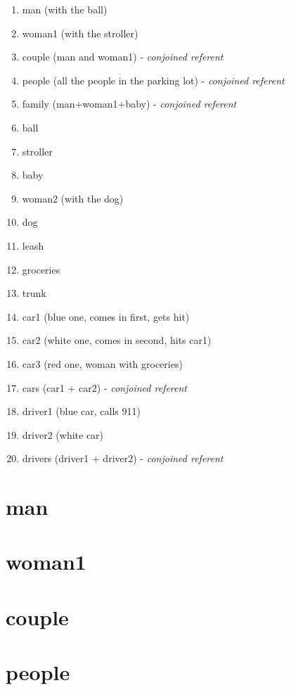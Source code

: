 \documentclass[
]{book}
\providecommand{\tightlist}{%
  \setlength{\itemsep}{0pt}\setlength{\parskip}{0pt}}
\begin{document}
\begin{enumerate}
\def\labelenumi{\arabic{enumi}.}
\tightlist
\item
  man (with the ball)
\item
  woman1 (with the stroller)
\item
  couple (man and woman1) - \emph{conjoined referent}
\item
  people (all the people in the parking lot) - \emph{conjoined referent}
\item
  family (man+woman1+baby) - \emph{conjoined referent}
\item
  ball
\item
  stroller
\item
  baby
\item
  woman2 (with the dog)
\item
  dog
\item
  leash
\item
  groceries
\item
  trunk
\item
  car1 (blue one, comes in first, gets hit)
\item
  car2 (white one, comes in second, hits car1)
\item
  car3 (red one, woman with groceries)
\item
  cars (car1 + car2) - \emph{conjoined referent}
\item
  driver1 (blue car, calls 911)
\item
  driver2 (white car)
\item
  drivers (driver1 + driver2) - \emph{conjoined referent}
\end{enumerate}

\hypertarget{man}{%
\section{man}\label{man}}

\hypertarget{woman1}{%
\section{woman1}\label{woman1}}

\hypertarget{couple}{%
\section{couple}\label{couple}}

\hypertarget{people}{%
\section{people}\label{people}}
\end{document}
